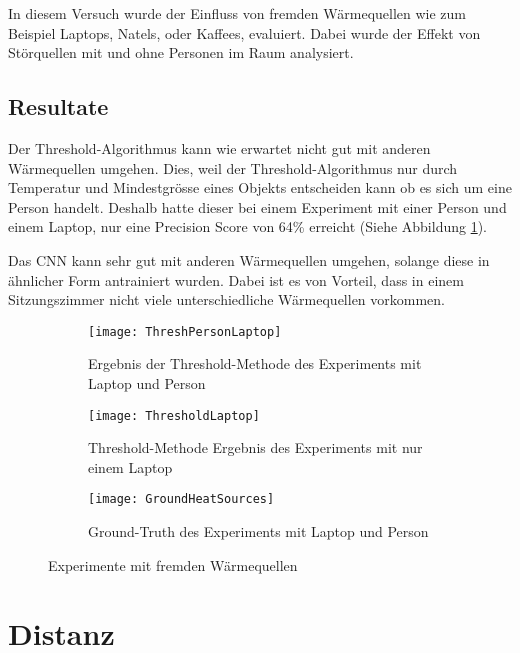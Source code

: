 In diesem Versuch wurde der Einfluss von fremden Wärmequellen wie zum Beispiel Laptops, Natels, oder Kaffees, evaluiert. Dabei wurde der Effekt von Störquellen mit und ohne Personen im Raum analysiert.

\subsection{Resultate}
\label{subsec:FWresultate}

Der Threshold-Algorithmus kann wie erwartet nicht gut mit anderen Wärmequellen umgehen. Dies, weil der Threshold-Algorithmus nur durch Temperatur und Mindestgrösse eines Objekts entscheiden kann ob es sich um eine Person handelt. Deshalb hatte dieser bei einem Experiment mit einer Person und einem Laptop, nur eine Precision Score von 64\% erreicht (Siehe Abbildung \ref{fig:ThreshPersonLaptop}).

Das \gls{CNN} kann sehr gut mit anderen Wärmequellen umgehen, solange diese in ähnlicher Form antrainiert wurden. Dabei ist es von Vorteil, dass in einem Sitzungszimmer nicht viele unterschiedliche Wärmequellen vorkommen.

\vspace{.5em}
\begin{figure}[H]
	\begin{subfigure}{.45\linewidth}
		\texttt{[image: ThreshPersonLaptop]}
		\caption{Ergebnis der Threshold-Methode des Experiments mit Laptop und Person}
		\label{fig:ThreshPersonLaptop}
	\end{subfigure}\hfill%
	\begin{subfigure}{.45\linewidth}
		\centering
		\texttt{[image: ThresholdLaptop]}
		\caption{Threshold-Methode Ergebnis des Experiments mit nur einem Laptop}
		\label{fig:thresholdDistanice10}
	\end{subfigure}
	\begin{subfigure}{\linewidth}
		\centering
		\texttt{[image: GroundHeatSources]}
		\caption{Ground-Truth des Experiments mit Laptop und Person}
		\label{fig:groundDiistance10}
	\end{subfigure}
	\caption{Experimente mit fremden Wärmequellen}
	\label{fig:HeatSources}
\end{figure}
\vspace{.5em}



\section{Distanz}
\label{sec:distanz}

